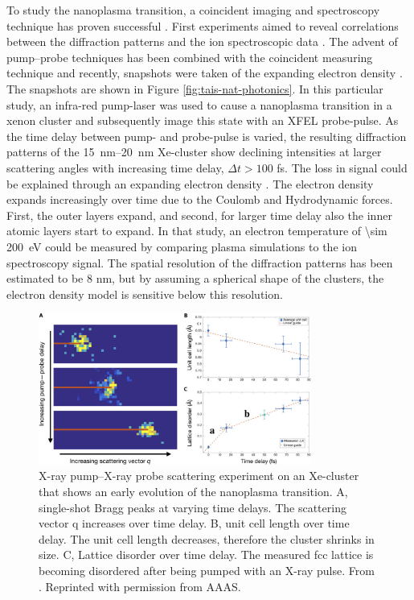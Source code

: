 To study the nanoplasma transition, a coincident imaging and spectroscopy technique has proven successful \citep{Bostedt-2012-PRL}. First experiments aimed to reveal correlations between the diffraction patterns and the ion spectroscopic data \citep{Gorkhover-2012-PRL,Rupp-2016-PRL}. The advent of pump--probe techniques has been combined with the coincident measuring technique and recently, snapshots were taken of the expanding electron density \citep{Gorkhover-2016-NatPho}. The snapshots are shown in Figure \ref{fig:tais-nat-photonics}. In this particular study, an infra-red pump-laser was used to cause a nanoplasma transition in a xenon cluster and subsequently image this state with an XFEL probe-pulse. As the time delay between pump- and probe-pulse is varied, the resulting diffraction patterns of the \SIrange{15}{20}{\nano\meter} Xe-cluster show declining intensities at larger scattering angles with increasing time delay, $\Delta t>100$ fs. The loss in signal could be explained through an expanding electron density \citep{Hau-Riege-2008-PRE,Peltz-2014-PRL}. The electron density expands increasingly over time due to the Coulomb and Hydrodynamic forces. First, the outer layers expand, and second, for larger time delay also the inner atomic layers start to expand. In that study, an electron temperature of \SI{\sim 200}{\electronvolt} could be measured by comparing plasma simulations to the ion spectroscopy signal. The spatial resolution of the diffraction patterns has been estimated to be 8 nm, but by assuming a spherical shape of the clusters, the electron density model is sensitive below this resolution.\\[1\baselineskip]
\begin{figure}
	\centering
		\includegraphics[width=0.80\textwidth]{images/ken-science.jpg}
	\caption[Experiment that shows early evolution of the nanoplasma transition.]{X-ray pump--X-ray probe scattering experiment on an Xe-cluster that shows an early evolution of the nanoplasma transition. A, single-shot Bragg peaks at varying time delays. The scattering vector q increases over time delay. B, unit cell length over time delay. The unit cell length decreases, therefore the cluster shrinks in size. C, Lattice disorder over time delay. The measured fcc lattice is becoming disordered after being pumped with an X-ray pulse. From \citep{Ferguson-2016-SciAdv}. Reprinted with permission from AAAS.}
	\label{fig:ken-science}
\end{figure}
